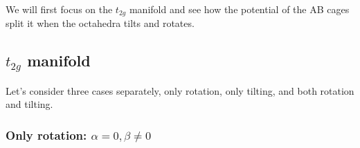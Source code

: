 \documentclass[a4paper,prb]{revtex4-1}  %
\newcommand{\az}[1]{{\color{magenta}{#1}}} %
\begin{document}
\az{Focus on t2g first:}\\

We will first focus on the $t_{2g}$ manifold
and see how the potential of the AB cages split it when 
the octahedra tilts and rotates.

\subsection{$t_{2g}$ manifold} %
\label{sec:t2g}

Let's consider three cases separately, only rotation, only tilting, and both rotation and tilting.

\subsubsection{Only rotation: $\alpha=0,\beta\neq 0$}
\label{sec:alpha0}

\end{document}
